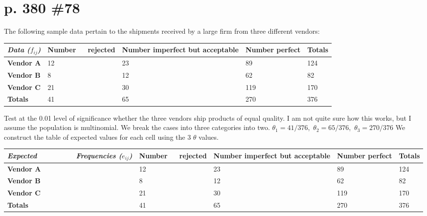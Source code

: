 \documentclass[12pt]{article}
\begin{document}
	\section[20pt]{p. 380 \#78}
	The following sample data pertain to the shipments received by a large firm from three different vendors:
	\newline
	\begin{tabular}{|p{2cm}|p{2.4cm}|p{2.4cm}|p{2.4cm}|p{1.6cm}|}
			\hline
			\textit{Data (\(f_{ij}\))} & \textbf{Number\ \ \ rejected} & \textbf{Number imperfect but acceptable} & \textbf{Number perfect} & \textbf{Totals} \\
			\hline
			\textbf{Vendor A} & 12 & 23 & 89 & 124 \\
			\hline
			\textbf{Vendor B} & 8 & 12 & 62 & 82 \\
			\hline
			\textbf{Vendor C} & 21 & 30 & 119 & 170 \\
			\hline
			\textbf{Totals} & 41 & 65 & 270  & 376 \\
			\hline
	\end{tabular}
	\newline
	Test at the 0.01 level of significance whether the three vendors ship products of equal quality.
	\newline
	\newline
	I am not quite sure how this works, but I assume the population is multinomial. We break the cases into three categories into two.
	\newline
	\newline
	\(\theta_1 = 41/376\),\ \(\theta_2 = 65/376\),\ \(\theta_3 = 270/376\)
	\newline \newline
	We construct the table of expected values for each cell using the 3 \(\theta\) values.
	\newline
	\begin{tabular}{|p{2cm}|p{2.4cm}|p{2.4cm}|p{2.4cm}|p{1.6cm}|}
			\hline
			\textit{Expected \ \ \ \ \ \ \ \ \ Frequencies (\(e_{ij}\))} & \textbf{Number\ \ \ rejected} & \textbf{Number imperfect but acceptable} & \textbf{Number perfect} & \textbf{Totals} \\
			\hline
			\textbf{Vendor A} & 12 & 23 & 89 & 124 \\
			\hline
			\textbf{Vendor B} & 8 & 12 & 62 & 82 \\
			\hline
			\textbf{Vendor C} & 21 & 30 & 119 & 170 \\
			\hline
			\textbf{Totals} & 41 & 65 & 270  & 376 \\
			\hline
	\end{tabular}
\end{document}
